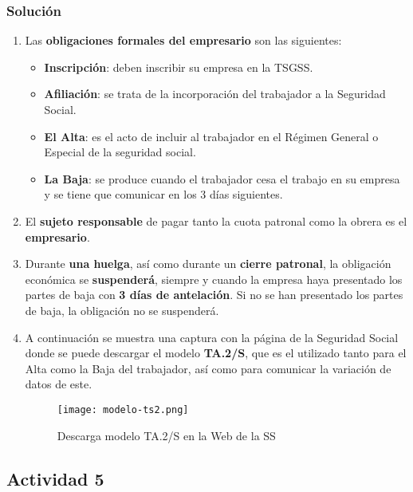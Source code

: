 \subsubsection{Solución}

\begin{enumerate}
    \item Las \textbf{obligaciones formales del empresario} son las siguientes:
    \begin{itemize}
        \item \textbf{Inscripción}: deben inscribir su empresa en la TSGSS.
        \item \textbf{Afiliación}: se trata de la incorporación del trabajador a la Seguridad Social.
        \item \textbf{El Alta}: es el acto de incluir al trabajador en el Régimen General o Especial de la seguridad social.
        \item \textbf{La Baja}: se produce cuando el trabajador cesa el trabajo en su empresa y se tiene que comunicar en los 3 días siguientes.
    \end{itemize}

    \item El \textbf{sujeto responsable} de pagar tanto la cuota patronal como la obrera es el \textbf{empresario}.

    \item Durante \textbf{una huelga}, así como durante un \textbf{cierre patronal}, la obligación económica se \textbf{suspenderá}, siempre y cuando la empresa haya presentado los partes de baja con \textbf{3 días de antelación}. Si no se han presentado los partes de baja, la obligación no se suspenderá.

    \item A continuación se muestra una captura con la página de la Seguridad Social donde se puede descargar el modelo \textbf{TA.2/S}, que es el utilizado tanto para el Alta como la Baja del trabajador, así como para comunicar la variación de datos de este.

    \begin{figure}[H]
        \centering
        \texttt{[image: modelo-ts2.png]}
        \caption{Descarga modelo TA.2/S en la Web de la SS}
    \end{figure}
\end{enumerate}

\subsection{Actividad 5}

